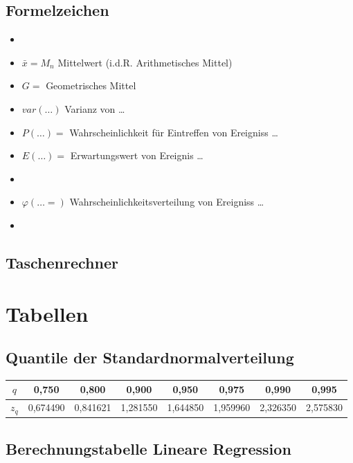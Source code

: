 \documentclass[margin=normal]{tex/hsrzf}
\begin{document}
\subsection*{Formelzeichen}
\begin{itemize}
    \item
    \item $\bar{x} = M_n$ Mittelwert (i.d.R. Arithmetisches Mittel)
    \item $G =$ Geometrisches Mittel
    \item $var(\dots)$ Varianz von \dots
    \item $P(\dots) =$ Wahrscheinlichkeit für Eintreffen von Ereigniss \dots
    \item $E(\dots) =$ Erwartungswert von Ereignis \dots
    \item
    \item $\varphi(\dots =)$ Wahrscheinlichkeitsverteilung von Ereigniss \dots
    \item
\end{itemize}

\subsection{Taschenrechner}

\newpage
\section{Tabellen}
\subsection{Quantile der Standardnormalverteilung}

\begin{tabular}{|c|c|c|c|c|c|c|c|}
    \hline
    $q$   & 0,750    & 0,800    & 0,900    & 0,950    & 0,975    & 0,990    & 0,995    \\
    \hline
    $z_q$ & 0,674490 & 0,841621 & 1,281550 & 1,644850 & 1,959960 & 2,326350 & 2,575830 \\
    \hline
\end{tabular}



\newpage
\subsection{Berechnungstabelle Lineare Regression}
\end{document}

